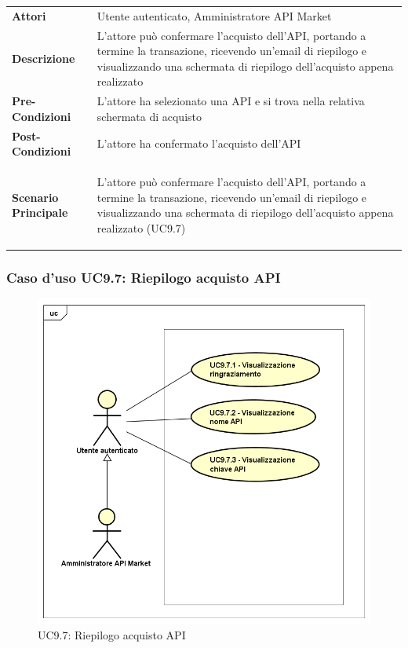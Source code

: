 \begin{minipage}{\linewidth}
	\begin{tabular}{ l | p{11cm}}
		\hline
		\rowcolor{Gray}
		\multicolumn{2}{c}{UC9.6 - Conferma acquisto API} \\
		\hline
		\textbf{Attori} & Utente autenticato, Amministratore API Market \\
		\textbf{Descrizione} & L'attore può confermare l'acquisto dell'API, portando a termine la transazione, ricevendo un'email di riepilogo e visualizzando una schermata di riepilogo dell'acquisto appena realizzato \\
		\textbf{Pre-Condizioni} & L'attore ha selezionato una API e si trova nella relativa schermata di acquisto \\
		\textbf{Post-Condizioni} & L'attore ha confermato l'acquisto dell'API \\
		\textbf{Scenario Principale} & 
		\begin{enumerate*}[label=(\arabic*.),itemjoin={\newline}]
			\item L'attore può confermare l'acquisto dell'API, portando a termine la transazione, ricevendo un'email di riepilogo e visualizzando una schermata di riepilogo dell'acquisto appena realizzato (UC9.7)
		\end{enumerate*}\\
	\end{tabular}
\end{minipage}

\newpage
\subsubsection{Caso d'uso UC9.7: Riepilogo acquisto API}
\label{UC9_7}
\begin{figure}[ht]
	\centering
	\includegraphics[scale=0.45]{UML/UC9_7.png}
	\caption{UC9.7: Riepilogo acquisto API}
\end{figure}

